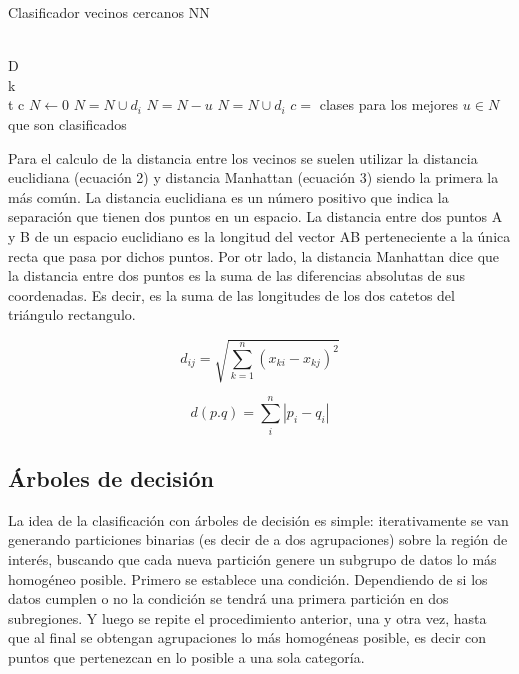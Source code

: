 \documentclass[conference]{IEEEtran}
\begin{document}
\begin{algorithm}[H]
\caption{Clasificador vecinos cercanos NN}
\begin{algorithmic}
\Require \\D {}\\
k \\
t 
\Ensure c 
\State $N \gets 0$
    \State $N=N \cup d_i$
\Else
    	\State $N=N-u$
    	\State $N=N\cup d_i$
    \EndIf
\EndIf
\EndFor
\State $c=$ clases para los mejores $u \in N$ que son clasificados 
\end{algorithmic}
\end{algorithm}

Para el calculo de la distancia entre los vecinos se suelen utilizar la distancia euclidiana (ecuación 2) y distancia Manhattan (ecuación 3) siendo la primera la más común. La distancia euclidiana es un número positivo que indica la separación que tienen dos puntos en un espacio. La distancia entre dos puntos A y B de un espacio euclidiano es la longitud del vector AB perteneciente a la única recta que pasa por dichos puntos. Por otr lado, la distancia Manhattan dice que la distancia entre dos puntos es la suma de las diferencias absolutas de sus coordenadas. Es decir, es la suma de las longitudes de los dos catetos del triángulo rectangulo.

\begin{equation}
d_{ij}=\sqrt{\sum_{k=1}^{n}(x_{ki}-x_{kj})^2}
\end{equation}

\begin{equation}
d(p.q)=\sum_{i}^{n}|p_i-q_i|
\end{equation}

\subsection{Árboles de decisión}
La idea de la clasificación con árboles de decisión es simple: iterativamente se van generando particiones binarias (es decir de a dos agrupaciones) sobre la región de interés, buscando que cada nueva partición genere un subgrupo de datos lo más homogéneo posible. Primero se establece una condición. Dependiendo de si los datos cumplen o no la condición se tendrá una primera partición en dos subregiones. Y luego se repite el procedimiento anterior, una y otra vez, hasta que al final se obtengan agrupaciones lo más homogéneas posible, es decir con puntos que pertenezcan en lo posible a una sola categoría.\\
\end{document}
